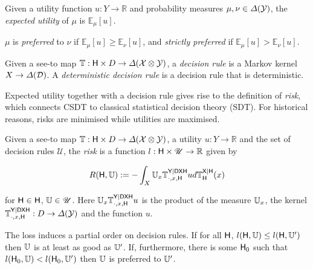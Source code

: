 \begin{definition}
Given a utility function $u:Y\to \mathbb{R}$ and probability measures $\mu,\nu\in \Delta(\mathcal{Y})$, the \emph{expected utility} of $\mu$ is $\mathbb{E}_{\mu}[u]$.

$\mu$ is \emph{preferred} to $\nu$ if $\mathbb{E}_{\mu}[u]\geq \mathbb{E}_{\nu}[u]$, and \emph{strictly preferred} if $\mathbb{E}_{\mu}[u]>\mathbb{E}_{\nu}[u]$.
\end{definition}

\begin{definition}
Given a see-to map $\mathbb{T}:\mathsf{H}\times D\to \Delta(\mathcal{X}\otimes\mathcal{Y})$, a \emph{decision rule} is a Markov kernel $X\to \Delta(\mathcal{D})$. A \emph{deterministic decision rule} is a decision rule that is deterministic.

\end{definition}

Expected utility together with a decision rule gives rise to the definition of \emph{risk}, which connects CSDT to classical statistical decision theory (SDT). For historical reasons, risks are minimised while utilities are maximised.

\begin{definition}[Risk]
Given a see-to map $\mathbb{T}:\mathsf{H}\times D\to \Delta(\mathcal{X}\otimes\mathcal{Y})$, a utility $u:Y\to \mathbb{R}$ and the set of decision rules $\mathscr{U}$, the \emph{risk} is a function $l:\mathsf{H}\times \mathscr{U}\to \mathbb{R}$ given by

\begin{align}
    R(\mathsf{H},\mathbb{U}) := - \int_X  \mathbb{U}_x \mathbb{T}^{\mathsf{Y}|\mathsf{D}\mathsf{X}\mathsf{H}}_{\cdot,x,\mathsf{H}} u d\mathbb{T}^{\mathsf{X}|\mathsf{H}}_{\mathsf{H}}(x)
\end{align}

for $\mathsf{H}\in \mathsf{H}$, $\mathbb{U}\in \mathscr{U}$. Here $\mathbb{U}_x \mathbb{T}^{\mathsf{Y}|\mathsf{D}\mathsf{X}\mathsf{H}}_{\cdot,x,\mathsf{H}} u$ is the product of the measure $\mathbb{U}_x$, the kernel $\mathbb{T}^{\mathsf{Y}|\mathsf{D}\mathsf{X}\mathsf{H}}_{\cdot,x,\mathsf{H}}:D\to \Delta(\mathcal{Y})$ and the function $u$.
\end{definition}

The loss induces a partial order on decision rules. If for all $\mathsf{H}$, $l(\mathsf{H},\mathbb{U})\leq l(\mathsf{H},\mathbb{U}')$ then $\mathbb{U}$ is at least as good as $\mathbb{U}'$. If, furthermore, there is some $\mathsf{H}_0$ such that $l(\mathsf{H}_0,\mathbb{U})<l(\mathsf{H}_0,\mathbb{U}')$ then $\mathbb{U}$ is preferred to $\mathbb{U}'$.

